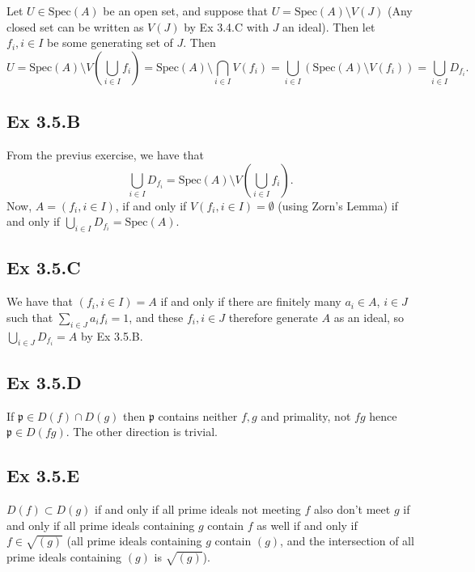 \documentclass{article}
\theoremstyle{definition}
\newcommand{\Spec}{\text{Spec}}
\begin{document}
Let $U \in \Spec(A)$ be an open set, and suppose that $U = \Spec(A) \setminus
V(J)$ (Any closed set can be written as $V(J)$ by Ex 3.4.C with $J$ an ideal).
Then let $f_i, i \in I$ be some generating set of $J$. Then
\[
	U 
	=
	\Spec(A) \setminus V\left( \bigcup_{i \in I} f_i \right)
	=
	\Spec(A) \setminus \bigcap_{i \in I} V\left(f_i\right)
	=
    \bigcup_{i \in I} \left(\Spec(A) \setminus V\left(f_i\right)\right)
	=
	\bigcup_{i \in I} D_{f_i}.
\]

\subsection*{Ex 3.5.B}

From the previus exercise, we have that 
\[
	\bigcup_{i \in I} D_{f_i}
	=
	\Spec(A) \setminus V\left(\bigcup_{i \in I} f_i\right).
\] 
Now, $A = (f_i, i \in I)$, if and only if $V(f_i, i \in I) = \emptyset$ (using
Zorn's Lemma) if and only if $\bigcup_{i \in I} D_{f_i} = \Spec(A)$.

\subsection*{Ex 3.5.C}

We have that $(f_i, i \in I) = A$ if and only if there are finitely many $a_i
\in A$, $i \in J$ such that $\sum_{i \in J} a_i f_i = 1$, and these $f_i, i \in
J$ therefore generate $A$ as an ideal, so $\bigcup_{i \in J} D_{f_i} = A$ by Ex
3.5.B.

\subsection*{Ex 3.5.D}

If $\mathfrak{p} \in D(f) \cap D(g)$ then $\mathfrak{p}$ contains neither $f,
g$ and primality, not $fg$ hence $\mathfrak{p} \in D(fg)$. The other direction
is trivial.

\subsection*{Ex 3.5.E}

$D(f) \subset D(g)$ if and only if all prime ideals not meeting $f$ also don't
meet $g$ if and only if all prime ideals containing $g$ contain $f$ as well if
and only if $f \in \sqrt{(g)}$ (all prime ideals containing $g$ contain $(g)$,
and the intersection of all prime ideals containing $(g)$ is $\sqrt{(g)}$). \\
\end{document}
